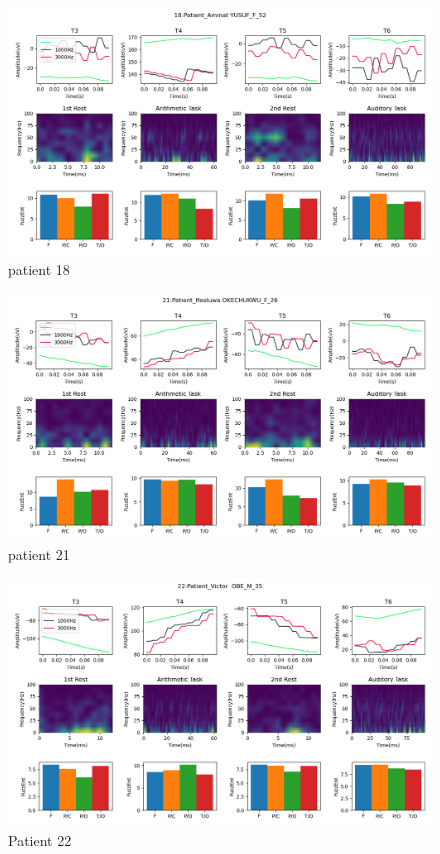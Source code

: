 \documentclass[conference]{IEEEconf}
\begin{document}
\clearpage
\begin{figure}
  \includegraphics[width=\textwidth]{../../data_analysis_results/results/Patient/18.png}
  \caption{patient 18}
  \label{fig:patient_18}
\end{figure}
\clearpage
\begin{figure}
  \includegraphics[width=\textwidth]{../../data_analysis_results/results/Patient/21.png}
  \caption{patient 21}
  \label{fig:patient_21}
\end{figure}
\clearpage
\begin{figure}
  \includegraphics[width=\textwidth]{../../data_analysis_results/results/Patient/22.png}
  \caption{Patient 22}
  \label{fig:patient_22}
\end{figure}
\end{document}
